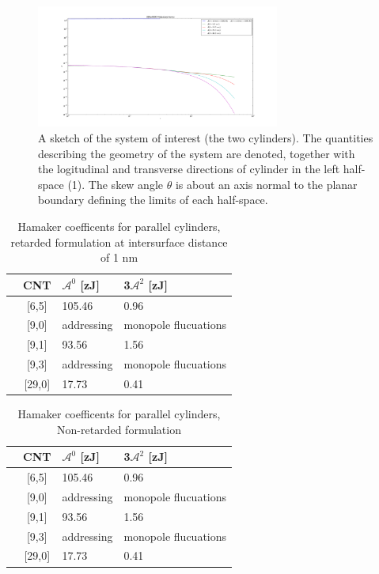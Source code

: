\documentclass[onecolumn,letterpaper,amsmath,amssymb,floatfix,aps,superscriptaddress]{revtex4}
\begin{document}
\begin{figure}
\centerline{\includegraphics[width=8cm]{par_plots/290w290_A_vs_n.pdf}}%
\caption{A sketch of the system of interest (the two cylinders). The quantities describing the geometry of the system are 
denoted, together with the logitudinal and transverse directions of cylinder in the left half-space (1). The skew angle $\theta$ is about an axis normal to the planar boundary defining the limits of each half-space.
}
\label{fig:sketch}
\end{figure}

\begin{table}[ht]
\caption{Hamaker coefficents for parallel cylinders, retarded formulation at
intersurface distance of 1 nm}%
\centering
\begin{tabular}{r c | l | l}
  \hline                       
  & CNT & $\mathcal{A}^{0}$ [zJ] & 3$\mathcal{A}^{2}$ [zJ] \\
  \hline
  &[6,5]  & 105.46 & 0.96 \\
  &[9,0]  & addressing & monopole flucuations \\
  &[9,1]  & 93.56 & 1.56 \\
  &[9,3]  & addressing & monopole flucuations \\
  &[29,0] & 17.73 & 0.41 \\
  \hline  
\end{tabular}
\label{table:nonlin}

\end{table}


\begin{table}[ht]
\caption{Hamaker coefficents for parallel cylinders, Non-retarded formulation}%
\centering
\begin{tabular}{r c | l | l}
  \hline                       
  & CNT & $\mathcal{A}^{0}$ [zJ] & 3$\mathcal{A}^{2}$ [zJ] \\
  \hline
  &[6,5]  & 105.46 & 0.96 \\
  &[9,0]  & addressing & monopole flucuations \\
  &[9,1]  & 93.56 & 1.56 \\
  &[9,3]  & addressing & monopole flucuations \\
  &[29,0] & 17.73 & 0.41 \\
  \hline  
\end{tabular}
\label{table:nonlin}

\end{table}
\end{document}
